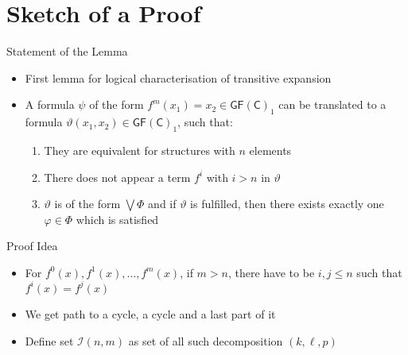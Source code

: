 \documentclass[aspectratio=169]{beamer}
\newcommand{\GFC}{\mathsf{GF}(\mathsf{C})}
\renewcommand{\theta}{\vartheta}
\renewcommand{\phi}{\varphi}
\begin{document}
	\section{Sketch of a Proof}
	
	\begin{frame}{Statement of the Lemma}
		\begin{itemize}
			\item First lemma for logical characterisation of transitive expansion
			\item A formula $\psi$ of the form $f^m(x_1)=x_2\in \GFC_1$ can be translated to a formula $\theta(x_1,x_2)\in\GFC_1$, such that:
			\begin{enumerate}
				\item They are equivalent for structures with $n$ elements
				\item There does not appear a term $f^i$ with $i>n$ in $\theta$
				\item $\theta$ is of the form $\bigvee \Phi$ and if $\theta$ is fulfilled, then there exists exactly one $\phi\in\Phi$ which is satisfied
			\end{enumerate}
		\end{itemize}
	\end{frame}
	
	\begin{frame}{Proof Idea}
		\begin{itemize}
			\item For $f^0(x),f^1(x),\dots,f^m(x)$, if $m>n$, there have to be $i,j\leq n$ such that $f^i(x)=f^j(x)$
			\item We get path to a cycle, a cycle and a last part of it
			\item Define set $\mathcal I(n,m)$ as set of all such decomposition $(k,\ell,p)$
		\end{itemize}
		\centering
	\end{frame}
	
\end{document}
